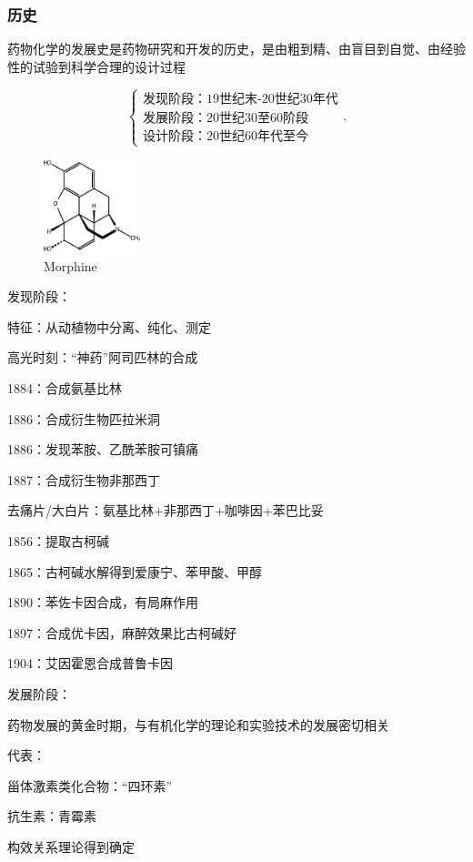 \subsubsection{历史}%
\label{subsub:历史}
\begin{notation}
    药物化学的发展史是药物研究和开发的历史，是由粗到精、由盲目到自觉、由经验性的试验到科学合理的设计过程
\end{notation}
\[
    \begin{cases}
        \text{发现阶段：19世纪末-20世纪30年代}\\
        \text{发展阶段：20世纪30至60阶段}\\
        \text{设计阶段：20世纪60年代至今}
    \end{cases}
.\] 
\begin{figure}[htpb]
    \centering
    \includegraphics[width=0.25\textwidth]{figures/Morphine}
    \caption{Morphine}
    \label{fig:fig-Morphine}
\end{figure}
\begin{notation}
    发现阶段：

    特征：从动植物中分离、纯化、测定

    高光时刻：“神药”阿司匹林的合成

    1884：合成氨基比林

    1886：合成衍生物匹拉米洞

    1886：发现苯胺、乙酰苯胺可镇痛

    1887：合成衍生物非那西丁

    去痛片/大白片：氨基比林+非那西丁+咖啡因+苯巴比妥

    1856：提取古柯碱

    1865：古柯碱水解得到爱康宁、苯甲酸、甲醇

    1890：苯佐卡因合成，有局麻作用

    1897：合成优卡因，麻醉效果比古柯碱好

    1904：艾因霍恩合成普鲁卡因
\end{notation}
\begin{notation}
    发展阶段：

    药物发展的黄金时期，与有机化学的理论和实验技术的发展密切相关

    代表：
    
    甾体激素类化合物：“四环素”

    抗生素：青霉素

    构效关系理论得到确定
\end{notation}


